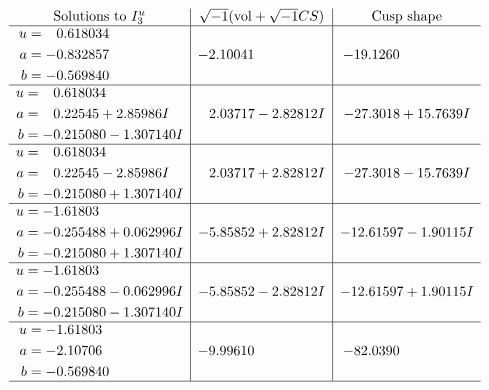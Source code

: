 \documentclass[1p]{elsarticle_modified}
\theoremstyle{definition}
\newcommand{\I}{\sqrt{-1}}
\begin{document}
$$\begin{array}{c|c|c}  
\text{Solutions to }I^u_{3}& \I (\text{vol} + \sqrt{-1}CS) & \text{Cusp shape}\\
 \hline 
\begin{aligned}
u &= \phantom{-}0.618034\phantom{ +0.000000I} \\
a &= -0.832857\phantom{ +0.000000I} \\
b &= -0.569840\phantom{ +0.000000I}\end{aligned}
 & -2.10041\phantom{ +0.000000I} & -19.1260\phantom{ +0.000000I} \\ \hline\begin{aligned}
u &= \phantom{-}0.618034\phantom{ +0.000000I} \\
a &= \phantom{-}0.22545 + 2.85986 I \\
b &= -0.215080 - 1.307140 I\end{aligned}
 & \phantom{-}2.03717 - 2.82812 I & -27.3018 + 15.7639 I \\ \hline\begin{aligned}
u &= \phantom{-}0.618034\phantom{ +0.000000I} \\
a &= \phantom{-}0.22545 - 2.85986 I \\
b &= -0.215080 + 1.307140 I\end{aligned}
 & \phantom{-}2.03717 + 2.82812 I & -27.3018 - 15.7639 I \\ \hline\begin{aligned}
u &= -1.61803\phantom{ +0.000000I} \\
a &= -0.255488 + 0.062996 I \\
b &= -0.215080 + 1.307140 I\end{aligned}
 & -5.85852 + 2.82812 I & -12.61597 - 1.90115 I \\ \hline\begin{aligned}
u &= -1.61803\phantom{ +0.000000I} \\
a &= -0.255488 - 0.062996 I \\
b &= -0.215080 - 1.307140 I\end{aligned}
 & -5.85852 - 2.82812 I & -12.61597 + 1.90115 I \\ \hline\begin{aligned}
u &= -1.61803\phantom{ +0.000000I} \\
a &= -2.10706\phantom{ +0.000000I} \\
b &= -0.569840\phantom{ +0.000000I}\end{aligned}
 & -9.99610\phantom{ +0.000000I} & -82.0390\phantom{ +0.000000I}\\
 \hline 
 \end{array}$$\newpage\newpage\renewcommand{\arraystretch}{1}
\end{document}
